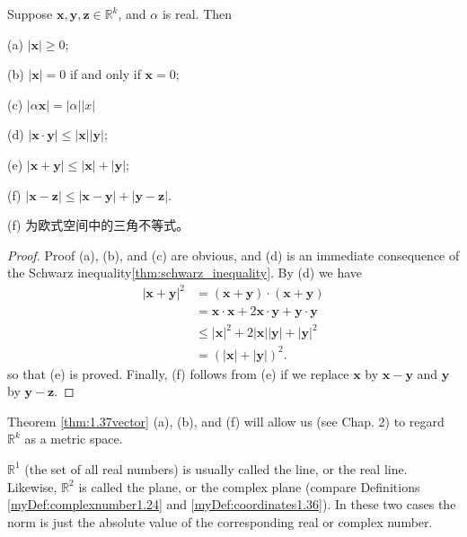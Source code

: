 \begin{thm}\label{thm:1.37vector}
    Suppose $\mathbf{x}, \mathbf{y}, \mathbf{z}\in\mathbb{R}^k$, and $\alpha$ is real. Then

(a) $| \mathbf{x}| \geq 0$;

(b) $| \mathbf{x}| = 0$ if and only if $\mathbf{x} =0$;

(c) $| \alpha \mathbf{x}| = | \alpha||x|$

(d) $|\mathbf{x}\cdot\mathbf{y}| \leq  |\mathbf{x}| | \mathbf{y}|$;

(e) $|\mathbf{x}+\mathbf{y}| \leq | \mathbf{x} | + | \mathbf{y}|$;

(f) $|\mathbf{x}-\mathbf{z}| \leq |\mathbf{x}-\mathbf{y}| + |\mathbf{y}-\mathbf{z}|$.
\end{thm}

(f) 为欧式空间中的三角不等式。

\begin{proof}
    Proof (a), (b), and (c) are obvious, and (d) is an immediate consequence of the Schwarz inequality\ref{thm:schwarz_inequality}. By (d) we have 
    \begin{align*}
        |\mathbf{x} + \mathbf{y}|^2
        &= (\mathbf{x} + \mathbf{y}) \cdot (\mathbf{x} + \mathbf{y})\\
        &= \mathbf{x} \cdot \mathbf{x} + 2\mathbf{x} \cdot \mathbf{y} + \mathbf{y} \cdot \mathbf{y}\\
        &\leq |\mathbf{x}|^2 + 2|\mathbf{x}||\mathbf{y}| + |\mathbf{y}|^2\\
        &= \left(|\mathbf{x}| + |\mathbf{y}|\right)^2.
    \end{align*}
    so that (e) is proved. Finally, (f) follows from (e) if we replace $\mathbf{x}$ by $\mathbf{x}-\mathbf{y}$ and $\mathbf{y}$ by $\mathbf{y}-\mathbf{z}$.
\end{proof}

\begin{myRemark}\label{myRemark:1.38}
    Theorem \ref{thm:1.37vector} (a), (b), and (f) will allow us (see Chap. 2) to
    regard $\mathbb{R}^k$ as a metric space.
    
    $\mathbb{R}^1$ (the set of all real numbers) is usually called the line, or the real line. Likewise, $\mathbb{R}^2$ is called the plane, or the complex plane (compare Definitions \ref{myDef:complexnumber1.24} and \ref{myDef:coordinates1.36}). In these two cases the norm is just the absolute value of the corresponding real or complex number. 
\end{myRemark}
